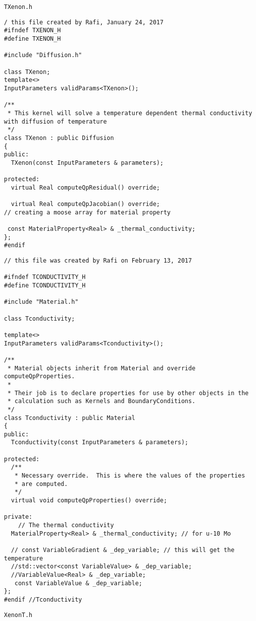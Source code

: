 \pagebreak
\texttt{TXenon.h}
\lstset{style=cpp}
\begin{lstlisting}
/ this file created by Rafi, January 24, 2017
#ifndef TXENON_H
#define TXENON_H

#include "Diffusion.h"

class TXenon;
template<>
InputParameters validParams<TXenon>();

/**
 * This kernel will solve a temperature dependent thermal conductivity with diffusion of temperature
 */
class TXenon : public Diffusion
{
public:
  TXenon(const InputParameters & parameters);

protected:
  virtual Real computeQpResidual() override;

  virtual Real computeQpJacobian() override;
// creating a moose array for material property

 const MaterialProperty<Real> & _thermal_conductivity;
};
#endif 

\end{lstlisting}
\pagebreak
\lstset{style=cpp}
\begin{lstlisting}
// this file was created by Rafi on February 13, 2017

#ifndef TCONDUCTIVITY_H
#define TCONDUCTIVITY_H

#include "Material.h"

class Tconductivity;

template<>
InputParameters validParams<Tconductivity>();

/**
 * Material objects inherit from Material and override computeQpProperties.
 *
 * Their job is to declare properties for use by other objects in the
 * calculation such as Kernels and BoundaryConditions.
 */
class Tconductivity : public Material
{
public:
  Tconductivity(const InputParameters & parameters);

protected:
  /**
   * Necessary override.  This is where the values of the properties
   * are computed.
   */
  virtual void computeQpProperties() override;

private:
    // The thermal conductivity 
  MaterialProperty<Real> & _thermal_conductivity; // for u-10 Mo

  // const VariableGradient & _dep_variable; // this will get the temperature 
  //std::vector<const VariableValue> & _dep_variable;
  //VariableValue<Real> & _dep_variable;
   const VariableValue & _dep_variable;
};
#endif //Tconductivity
\end{lstlisting}
\pagebreak
\texttt{XenonT.h}
\lstset{style=cpp}
